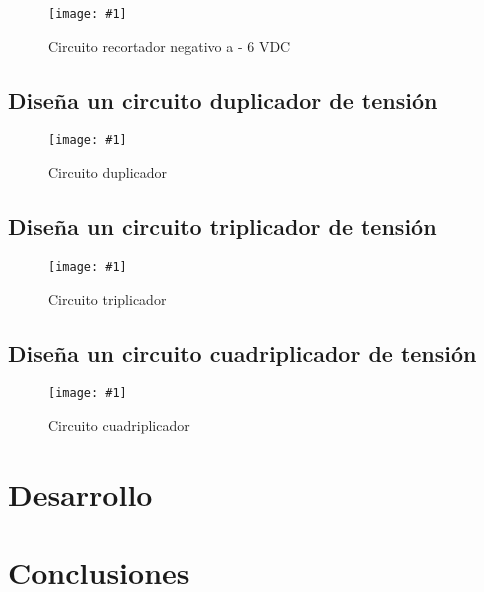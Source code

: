 \documentclass{mylib/reporteConCalif}
\newcommand{\insertImage}[3]{
	\begin{figure}[H]
		\centering
		\texttt{[image: \#1]}
		\caption{#2}
	\end{figure}
}
\begin{document}
\insertImage{img/labdisp_pract5/recPolNeg}{Circuito recortador negativo a - 6 VDC}{12}

\subsection{Diseña un circuito duplicador de tensión}

\insertImage{img/labdisp_pract5/dup_1mf}{Circuito duplicador}{12}

\subsection{Diseña un circuito triplicador de tensión}

\insertImage{img/labdisp_pract5/trip_10mf}{Circuito triplicador}{12}

\subsection{Diseña un circuito cuadriplicador de tensión}

\insertImage{img/labdisp_pract5/cuad_10mf}{Circuito cuadriplicador}{12}

\newpage
\section{Desarrollo}


\section{Conclusiones}
\end{document}
